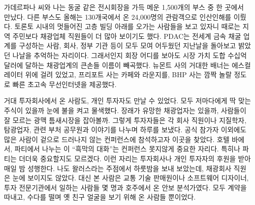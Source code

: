 \documentclass{translation}
\begin{document}
가데르파나 씨와 나는 동굴 같은 전시회장을 가득 메운 1,500개의 부스 중 한 곳에서 만났다.
다른 부스도 올해는 130개국에서 온 24,000명의 관람객으로 인산인해를 이뤘다.
토론토 시내의 멋들어진 고층 빌딩 아래를 오가는 사람들을 보고 있자니 때로는 지역 주민보다 채광업체 직원들이 더 많아 보이기도 했다.
PDAC는 전세계 금속 채굴 업계를 구성하는 사람, 회사, 정부 기관 등이 모두 모여 어두웠던 지난날을 돌아보고 밝았던 나날을 추억하는 자리이다.
그래서인지 회장 어디를 보아도 시장 가치 도합 수십억 달러에 달하는 채광업계의 큰손들 이름이 빼곡했다.
뉴몬트 사의 거대한 배너는 에스컬레이터 위에 걸려 있었고,
프리포트 사는 카페와 라운지를, BHP 사는 깜짝 놀랄 정도로 빠른 초고속 무선인터넷을 제공했다.
%

거대 투자회사에서 온 사람도, 개인 투자자도 만날 수 있었다.
모두 저마다에게 딱 맞는 주식이 있을까 눈에 불을 켜고 물색했다.
장래가 유망한 채광업자는 있을까, 사람들이 잘 모르는 광맥 틈새시장을 잡아볼까.
그렇게 투자자들은 각 회사 직원이나 지질학자, 탐광업자, 관련 부처 공무원과 이야기를 나누며 하루를 보냈다.
공식 참가자 이외에도 많은 사람이 겉으로 드러나지 않는 컨퍼런스에 참석하고자 이곳을 찾았다.
호텔 바에서, 파티에서 나누는 이 ``흑막의 대화''는 컨퍼런스 못지않게 중요한 자리다.
특히나 파티는 더더욱 중요할지도 모르겠다.
이런 자리는 투자회사나 개인 투자자의 후원을 받아 매일 밤 성행한다.
나도 왈러스라는 주점에서 하룻밤을 보내 보았는데, 채광회사 직원은 눈에 보이지도 않았다.
대신 본 사람은 교통 기술 판매원이나 소프트웨어 디자이너, 투자 전문기관에서 일하는 사람들 몇 명과 호주에서 온 안보 분석가였다.
모두 계약을 따내고, 수다를 떨며 옛 친구 얼굴을 보기 위해 온 사람들 뿐이었다.
%
\end{document}
